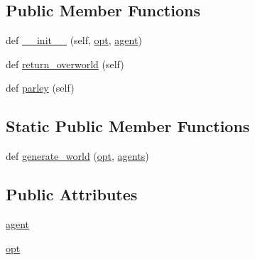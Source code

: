 \subsection*{Public Member Functions}
\begin{DoxyCompactItemize}
\item 
def \hyperlink{classparlai_1_1chat__service_1_1services_1_1messenger_1_1worlds_1_1SimpleMessengerOverworld_a0081e4e70d79093a7a03ce0a29ef52fa}{\+\_\+\+\_\+init\+\_\+\+\_\+} (self, \hyperlink{classparlai_1_1chat__service_1_1services_1_1messenger_1_1worlds_1_1SimpleMessengerOverworld_a1d7cfe5c5771966cb486cfebaef576e8}{opt}, \hyperlink{classparlai_1_1chat__service_1_1services_1_1messenger_1_1worlds_1_1SimpleMessengerOverworld_ae8eee9f312b3a5998283087df1bda95f}{agent})
\item 
def \hyperlink{classparlai_1_1chat__service_1_1services_1_1messenger_1_1worlds_1_1SimpleMessengerOverworld_a69d3f1ced23ef51fae88d92ed5ea085b}{return\+\_\+overworld} (self)
\item 
def \hyperlink{classparlai_1_1chat__service_1_1services_1_1messenger_1_1worlds_1_1SimpleMessengerOverworld_a6de597ae2b81934e3d05a0480263f0db}{parley} (self)
\end{DoxyCompactItemize}
\subsection*{Static Public Member Functions}
\begin{DoxyCompactItemize}
\item 
def \hyperlink{classparlai_1_1chat__service_1_1services_1_1messenger_1_1worlds_1_1SimpleMessengerOverworld_acf14afbe11a177033a4bfd0eed040f83}{generate\+\_\+world} (\hyperlink{classparlai_1_1chat__service_1_1services_1_1messenger_1_1worlds_1_1SimpleMessengerOverworld_a1d7cfe5c5771966cb486cfebaef576e8}{opt}, \hyperlink{classparlai_1_1core_1_1worlds_1_1World_a728f75194cc26ea4035047c46cf62608}{agents})
\end{DoxyCompactItemize}
\subsection*{Public Attributes}
\begin{DoxyCompactItemize}
\item 
\hyperlink{classparlai_1_1chat__service_1_1services_1_1messenger_1_1worlds_1_1SimpleMessengerOverworld_ae8eee9f312b3a5998283087df1bda95f}{agent}
\item 
\hyperlink{classparlai_1_1chat__service_1_1services_1_1messenger_1_1worlds_1_1SimpleMessengerOverworld_a1d7cfe5c5771966cb486cfebaef576e8}{opt}
\end{DoxyCompactItemize}


